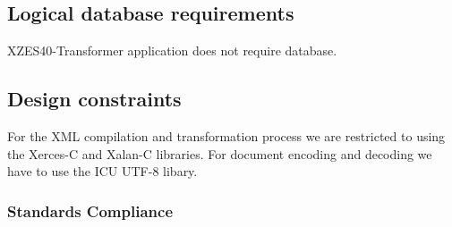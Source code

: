 \subsection{Logical database requirements}

XZES40-Transformer application does not require database. 

\subsection{Design constraints}


For the XML compilation and transformation process we are restricted to using the Xerces-C and Xalan-C libraries.
For document encoding and decoding we have to use the ICU UTF-8 libary.


\subsubsection{Standards Compliance}

